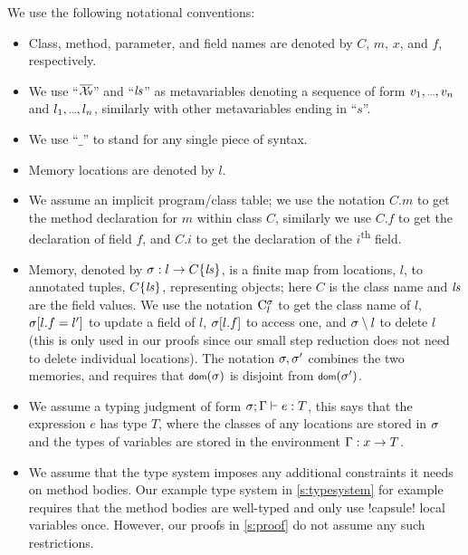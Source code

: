 We use the following notational conventions:
\begin{itemize}
	\item Class, method, parameter, and field names are denoted by $C$, $m$, $x$, and $f$, respectively.
	\item We use ``$\vs$'' and ``$\mathit{ls}$'' as metavariables denoting a sequence of form $\range{v}$ and $\range{l}$, similarly with other metavariables ending in ``$s$''.
	\item We use ``$\_$'' to stand for any single piece of syntax.
	\item Memory locations are denoted by $l$.
	\item We assume an implicit program/class table; we use the notation $C.m$ to get the method declaration for $m$ within class $C$, similarly we use $C.f$ to get the declaration of field $f$, and $C.i$ to get the declaration of the $i$\textsuperscript{th} field.
	\item Memory, denoted by $\sigma : l\rightarrow C\{\mathit{ls}\}$, is a finite map from locations, $l$, to annotated tuples, $C\{\mathit{ls}\}$, representing objects; here $C$ is the class name and $\mathit{ls}$ are the 
	field values.
	We use the notation $\mathrm{C}^{\sigma}_{l}$ to get the class name of $l$, $\sigma[l.f=l']$ to update a field of $l$, $\sigma[l.f]$ to access one, and $\sigma \setminus l$ to delete $l$ (this is only used in our proofs since our small step reduction does not need to delete individual locations). The notation $\sigma,\sigma'$ combines the two memories, and requires that $\dom(\s)$ is disjoint from $\dom(\s')$.
	\item We assume a typing judgment of form $\ty{e}{T}$, this says that the expression $e$ has type $T$,
	where the classes of any locations are stored in $\sigma$ and the types of variables are stored in the environment $\Gamma : x\rightarrow T$.
	
	\item We assume that the type system imposes any additional constraints it needs on method bodies.
	Our example type system in \autoref{s:typesystem} for example requires that the method bodies are well-typed and only use \Q!capsule! local variables once. However, our proofs in \autoref{s:proof} do not assume any such restrictions.
	
\end{itemize}

